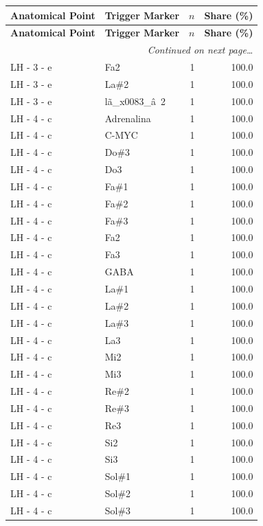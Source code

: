 \documentclass[a4paper,11pt]{article}
\begin{document}
\begin{footnotesize}
\begin{longtable}{p{3.5cm}p{7.5cm}rr}
\toprule
\textbf{Anatomical Point} &
\textbf{Trigger Marker} &
\textbf{$n$} &
\textbf{Share (\%)} \\
\midrule
\endfirsthead
\toprule
\textbf{Anatomical Point} &
\textbf{Trigger Marker} &
\textbf{$n$} &
\textbf{Share (\%)} \\
\midrule
\endhead
\midrule
\multicolumn{4}{r}{\footnotesize\emph{Continued on next page\ldots}} \\
\endfoot
\bottomrule
\endlastfoot
LH - 3 - e & Fa2 & 1 & 100.0 \\
LH - 3 - e & La\#2 & 1 & 100.0 \\
LH - 3 - e & lã\_x0083\_â 2 & 1 & 100.0 \\
LH - 4 - c & Adrenalina & 1 & 100.0 \\
LH - 4 - c & C-MYC & 1 & 100.0 \\
LH - 4 - c & Do\#3 & 1 & 100.0 \\
LH - 4 - c & Do3 & 1 & 100.0 \\
LH - 4 - c & Fa\#1 & 1 & 100.0 \\
LH - 4 - c & Fa\#2 & 1 & 100.0 \\
LH - 4 - c & Fa\#3 & 1 & 100.0 \\
LH - 4 - c & Fa2 & 1 & 100.0 \\
LH - 4 - c & Fa3 & 1 & 100.0 \\
LH - 4 - c & GABA & 1 & 100.0 \\
LH - 4 - c & La\#1 & 1 & 100.0 \\
LH - 4 - c & La\#2 & 1 & 100.0 \\
LH - 4 - c & La\#3 & 1 & 100.0 \\
LH - 4 - c & La3 & 1 & 100.0 \\
LH - 4 - c & Mi2 & 1 & 100.0 \\
LH - 4 - c & Mi3 & 1 & 100.0 \\
LH - 4 - c & Re\#2 & 1 & 100.0 \\
LH - 4 - c & Re\#3 & 1 & 100.0 \\
LH - 4 - c & Re3 & 1 & 100.0 \\
LH - 4 - c & Si2 & 1 & 100.0 \\
LH - 4 - c & Si3 & 1 & 100.0 \\
LH - 4 - c & Sol\#1 & 1 & 100.0 \\
LH - 4 - c & Sol\#2 & 1 & 100.0 \\
LH - 4 - c & Sol\#3 & 1 & 100.0 \\

\end{longtable}
\end{footnotesize}
\end{document}
